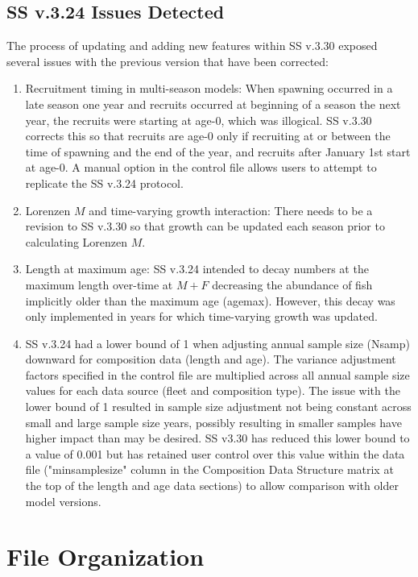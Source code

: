 \subsection{SS v.3.24 Issues Detected}
The process of updating and adding new features within SS v.3.30 exposed several issues with the previous version that have been corrected:
\begin{enumerate}
	\item Recruitment timing in multi-season models: When spawning occurred in a late season one year and recruits occurred at beginning of a season the next year, the recruits were starting at age-0, which was illogical.  SS v.3.30 corrects this so that recruits are age-0 only if recruiting at or between the time of spawning and the end of the year, and recruits after January 1st start at age-0.  A manual option in the control file allows users to attempt to replicate the SS v.3.24 protocol.
	\item Lorenzen $M$ and time-varying growth interaction: There needs to be a revision to SS v.3.30 so that growth can be updated each season prior to calculating Lorenzen $M$.
	\item Length at maximum age: SS v.3.24 intended to decay numbers at the maximum length over-time at $M + F$ decreasing the abundance of fish implicitly older than the maximum age (agemax).  However, this decay was only implemented in years for which time-varying growth was updated.  
	\item SS v.3.24 had a lower bound of 1 when adjusting annual sample size (Nsamp) downward for composition data (length and age).  The variance adjustment factors specified in the control file are multiplied across all annual sample size values for each data source (fleet and composition type).  The issue with the lower bound of 1 resulted in sample size adjustment not being constant across small and large sample size years, possibly resulting in smaller samples have higher impact than may be desired.  SS v3.30 has reduced this lower bound to a value of 0.001 but has retained user control over this value within the data file ("minsamplesize" column in the Composition Data Structure matrix at the top of the length and age data sections) to allow comparison with older model versions. 
\end{enumerate}

		
\section{File Organization}\label{FileOrganization}		

